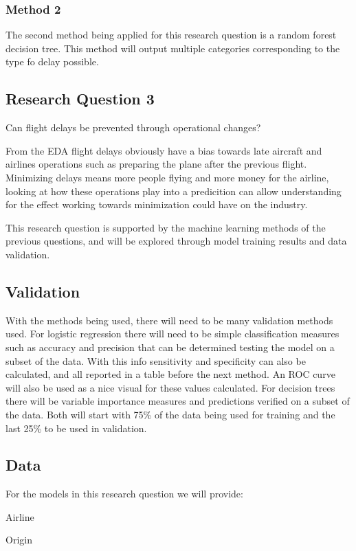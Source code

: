 \documentclass[a4paper,12pt]{article}
\begin{document}
\subsubsection{Method 2}
The second method being applied for this research question is a random forest decision tree. This method will output multiple categories corresponding to the type fo delay possible.


\subsection{Research Question 3}
Can flight delays be prevented through operational changes?

From the EDA flight delays obviously have a bias towards late aircraft and airlines operations such as preparing the plane after the previous flight. 
Minimizing delays means more people flying and more money for the airline, looking at how these operations play into a predicition can allow understanding for 
the effect working towards minimization could have on the industry.

This research question is supported by the machine learning methods of the previous questions, and will be explored through model training results
and data validation.

\subsection{Validation}
With the methods being used, there will need to be many validation methods used. For logistic regression there will need to be simple classification measures such as accuracy and precision that can be determined
testing the model on a subset of the data. With this info sensitivity and specificity can also be calculated, and all reported in a table before the next method. An ROC curve will also be used as a nice visual for these values calculated.
For decision trees there will be variable importance measures and predictions verified on a subset of the data. Both will start with 75\% of the data being used for training and the last 25\% to be used in validation.

\subsection{Data}
For the models in this research question we will provide:

Airline

Origin
\end{document}
